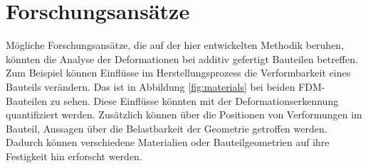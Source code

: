 \section{Forschungsansätze}

Mögliche Forschungsansätze, die auf der hier entwickelten Methodik beruhen, 
könnten die Analyse der Deformationen bei additiv gefertigt Bauteilen betreffen.
Zum Beispiel können Einflüsse im Herstellungsprozess die Verformbarkeit eines Bauteils
verändern. Das ist in Abbildung \ref{fig:materials} bei beiden FDM-Bauteilen zu sehen.
Diese Einflüsse könnten mit der Deformationserkennung quantifiziert werden.
Zusätzlich können über die Positionen von Verformungen im Bauteil, Aussagen über die 
Belastbarkeit der Geometrie getroffen werden. Dadurch können verschiedene Materialien oder 
Bauteilgeometrien auf ihre Festigkeit hin erforscht werden.


